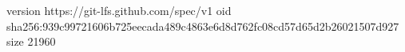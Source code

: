 version https://git-lfs.github.com/spec/v1
oid sha256:939c99721606b725eecada489c4863e6d8d762fc08cd57d65d2b26021507d927
size 21960
